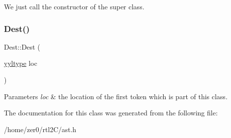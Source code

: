 We just call the constructor of the super class. \mbox{\label{class_dest_a529c34667b0fffbfcb5941cb7fcda33c}} 
\subsubsection{\texorpdfstring{Dest()}{Dest()}\hspace{0.1cm}{\footnotesize\ttfamily [2/2]}}
{\footnotesize\ttfamily Dest\+::\+Dest (\begin{DoxyParamCaption}\item[{\hyperlink{structyyltype}{yyltype}}]{loc }\end{DoxyParamCaption})\hspace{0.3cm}{\ttfamily [inline]}}


\begin{DoxyParams}{Parameters}
{\em loc} & the location of the first token which is part of this class. \\
\hline
\end{DoxyParams}


The documentation for this class was generated from the following file\+:\begin{DoxyCompactItemize}
\item 
/home/zer0/rtl2\+C/ast.\+h\end{DoxyCompactItemize}
